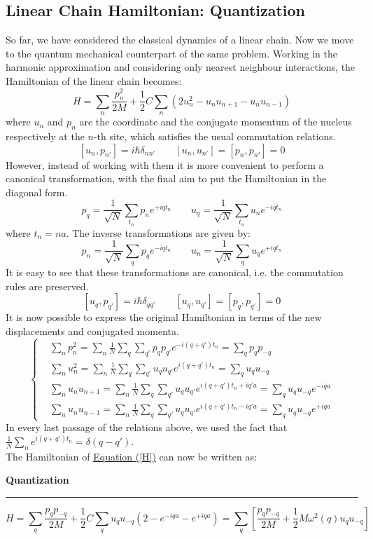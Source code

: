 \documentclass[10.75pt,a4paper,openright,bottom=2cm]{article}
\newcommand{\RN}[1]{%
  \textup{\uppercase\expandafter{\romannumeral#1}}%
}
\begin{document}
\subsection{Linear Chain Hamiltonian: \RN{1} Quantization}
So far, we have considered the classical dynamics of a linear chain. Now we move to the quantum mechanical counterpart of the same problem. Working in the harmonic approximation and considering only nearest neighbour interactions, the Hamiltonian of the linear chain becomes:
\begin{equation}
\label{H}
H=\sum_n\frac{p_n^2}{2M}+\frac{1}{2}C\sum_n(2u_n^2-u_nu_{n+1}-u_nu_{n-1})
\end{equation}
where $u_n$ and $p_n$ are the coordinate and the conjugate momentum of the nucleus respectively at the $n$-th site, which satisfies the usual commutation relations.
\[
[u_n,p_{n'}]=i\hbar\delta_{nn'} \qquad [u_n,u_{n'}]=[p_n,p_{n'}]=0
\]
However, instead of working with them it is more convenient to perform a canonical transformation, with the final aim to put the Hamiltonian in the diagonal form.
\[
p_q=\frac{1}{\sqrt{N}}\sum_{t_n}p_ne^{+iqt_n} \qquad u_q=\frac{1}{\sqrt{N}}\sum_{t_n}u_ne^{-iqt_n}
\]
where $t_n=na$. The inverse transformations are given by:
\[
p_n=\frac{1}{\sqrt{N}}\sum_qp_qe^{-iqt_n} \qquad u_n=\frac{1}{\sqrt{N}}\sum_qu_qe^{+iqt_n}
\]
It is easy to see that these transformations are canonical, i.e. the commutation rules are preserved.
\[
[u_q,p_{q'}]=i\hbar\delta_{qq'} \qquad [u_q,u_{q'}]=[p_q,p_{q'}]=0
\]
It is now possible to express the original Hamiltonian in terms of the new displacements and conjugated momenta.
\[
\left\{
\begin{aligned}
&\sum_np_n^2=\sum_n\frac{1}{N}\sum_q\sum_{q'}p_qp_{q'}e^{-i(q+q')t_n}=\sum_qp_qp_{-q}\\
&\sum_nu_n^2=\sum_n\frac{1}{N}\sum_q\sum_{q'}u_qu_{q'}e^{i(q+q')t_n}=\sum_qu_qu_{-q}\\
&\sum_nu_nu_{n+1}=\sum_n\frac{1}{N}\sum_q\sum_{q'}u_qu_{q'}e^{i(q+q')t_n+iq'a}=\sum_qu_qu_{-q}e^{-iqa}\\
&\sum_nu_nu_{n-1}=\sum_n\frac{1}{N}\sum_q\sum_{q'}u_qu_{q'}e^{i(q+q')t_n-iq'a}=\sum_qu_qu_{-q}e^{+iqa}
\end{aligned}
\right.
\]
In every last passage of the relations above, we used the fact that $\frac{1}{N}\sum_ne^{i(q+q')t_n}=\delta(q-q')$.\\
The Hamiltonian of \hyperref[H]{Equation (\ref{H})} can now be written as:
\begin{mybox}
\textbf{\RN{1} Quantization{\color{blue!30}{g}}}
\hrule
\vspace{0.2cm}
\begin{equation}
\label{H1}
H=\sum_q\frac{p_qp_{-q}}{2M}+\frac{1}{2}C\sum_qu_qu_{-q}(2-e^{-iqa }-e^{+iqa})=\sum_q\left[\frac{p_qp_{-q}}{2M}+\frac{1}{2}M\omega^2(q)u_qu_{-q}\right]
\end{equation}
\end{mybox}\noindent
\end{document}
